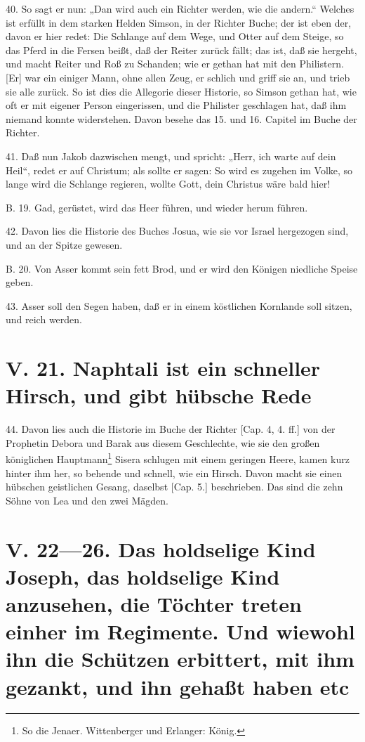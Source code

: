 40. So sagt er nun: „Dan wird auch ein Richter werden, wie die andern.“ Welches ist erfüllt in dem starken Helden Simson, in der Richter Buche; der ist eben der, davon er hier redet: Die Schlange auf dem Wege, und Otter auf dem Steige, so das Pferd in die Fersen beißt, daß der Reiter zurück fällt; das ist, daß sie hergeht, und macht Reiter und Roß zu Schanden; wie er gethan hat mit den Philistern. [Er] war ein einiger Mann, ohne allen Zeug, er schlich und griff sie an, und trieb sie alle zurück. So ist dies die Allegorie dieser Historie, so Simson gethan hat, wie oft er mit eigener Person eingerissen, und die Philister geschlagen hat, daß ihm niemand konnte widerstehen. Davon besehe das 15. und 16. Capitel im Buche der Richter.

41. Daß nun Jakob dazwischen mengt, und spricht: „Herr, ich warte auf dein Heil“, redet er auf Christum; als sollte er sagen: So wird es zugehen im Volke, so lange wird die Schlange regieren, wollte Gott, dein Christus wäre bald hier!

B. 19. Gad, gerüstet, wird das Heer führen, und wieder herum führen.

42. Davon lies die Historie des Buches Josua, wie sie vor Israel hergezogen sind, und an der Spitze gewesen.

B. 20. Von Asser kommt sein fett Brod, und er wird den Königen niedliche Speise geben.

43. Asser soll den Segen haben, daß er in einem köstlichen Kornlande soll sitzen, und reich werden.

\section[V. 21. Naphtali ist ein schneller Hirsch, und]{V. 21. Naphtali ist ein schneller Hirsch, und gibt hübsche Rede}

44. Davon lies auch die Historie im Buche der Richter [Cap. 4, 4. ff.] von der Prophetin Debora und Barak aus diesem Geschlechte, wie sie den großen königlichen Hauptmann\footnote{So die Jenaer. Wittenberger und Erlanger: König.} Sisera schlugen mit einem geringen Heere, kamen kurz hinter ihm her, so behende und schnell, wie ein Hirsch. Davon macht sie einen hübschen geistlichen Gesang, daselbst [Cap. 5.] beschrieben. Das sind die zehn Söhne von Lea und den zwei Mägden.

\section[V. 22—26. Das holdselige Kind Joseph, das holdselige]{V. 22—26. Das holdselige Kind Joseph, das holdselige Kind anzusehen, die Töchter treten einher im Regimente. Und wiewohl ihn die Schützen erbittert, mit ihm gezankt, und ihn gehaßt haben etc}

